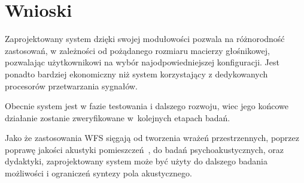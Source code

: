 \documentclass[12pt]{oska}
\let\Oldsection\section
\renewcommand{\section}{\FloatBarrier\Oldsection}
\begin{document}
\section{Wnioski}

Zaprojektowany system dzięki swojej modułowości pozwala na różnorodność
zastosowań, w zależności od pożądanego rozmiaru macierzy głośnikowej,
pozwalając użytkownikowi na wybór najodpowiedniejszej konfiguracji. Jest
ponadto bardziej ekonomiczny niż system korzystający z dedykowanych procesorów
przetwarzania sygnałów.

Obecnie system jest w fazie testowania i dalszego rozwoju, wiec jego końcowe
działanie zostanie zweryfikowane w~kolejnych etapach badań.

Jako że zastosowania WFS sięgają od tworzenia wrażeń przestrzennych, poprzez
poprawę jakości akustyki pomieszczeń~\cite{enhancement}, do badań
psychoakustycznych, oraz dydaktyki, zaprojektowany system może być użyty
do dalszego badania możliwości i ograniczeń syntezy pola akustycznego.

\printbibliography
\end{document}
